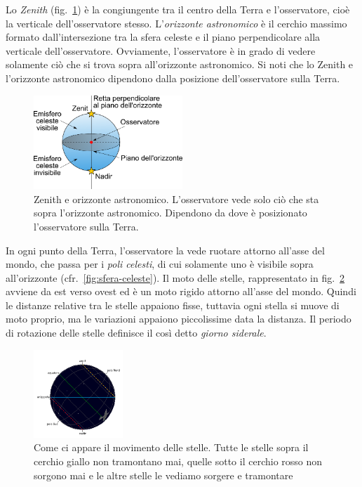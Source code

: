 Lo \emph{Zenith} (fig.~\ref{fig:zenith}) è la congiungente tra il centro della Terra e l'osservatore, cioè la verticale dell'osservatore stesso. L'\emph{orizzonte astronomico} è il cerchio massimo formato dall'intersezione tra la sfera celeste e il piano perpendicolare alla verticale dell'osservatore. Ovviamente, l'osservatore è in grado di vedere solamente ciò che si trova sopra all'orizzonte astronomico. Si noti che lo Zenith e l'orizzonte astronomico dipendono dalla posizione dell'osservatore sulla Terra.

\begin{figure}
\centering
\includegraphics[width=0.5\textwidth]{immagini/zenit.png}
\caption{Zenith e orizzonte astronomico. L'osservatore vede solo ciò che sta sopra l'orizzonte astronomico. Dipendono da dove è posizionato l'osservatore sulla Terra.}
\label{fig:zenith}
\end{figure}

In ogni punto della Terra, l'osservatore la vede ruotare attorno all'asse del mondo, che passa per i \emph{poli celesti}, di cui solamente uno è visibile sopra all'orizzonte (cfr.~\ref{fig:sfera-celeste}). Il moto delle stelle, rappresentato in fig.~\ref{fig:movimento-stelle} avviene da est verso ovest ed è un moto rigido attorno all'asse del mondo. Quindi le distanze relative tra le stelle appaiono fisse, tuttavia ogni stella si muove di moto proprio, ma le variazioni appaiono piccolissime data la distanza. Il periodo di rotazione delle stelle definisce il così detto \emph{giorno siderale}.

\begin{figure}
\centering
\includegraphics[width=0.3\textwidth]{immagini/movimento-stelle.png}
\caption{Come ci appare il movimento delle stelle. Tutte le stelle sopra il cerchio giallo non tramontano mai, quelle sotto il cerchio rosso non sorgono mai e le altre stelle le vediamo sorgere e tramontare}
\label{fig:movimento-stelle}
\end{figure}

